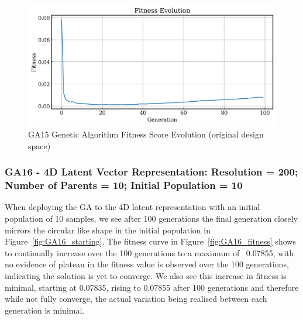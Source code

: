 \documentclass{article}
\begin{document}
\begin{figure}[H]
    \centering
    \includegraphics[width=0.75\linewidth]{figures/GAResults/GA15/original/original_fitness.png}
    \caption{GA15 Genetic Algorithm Fitness Score Evolution (original design space)}
    \label{fig:GA15_fitness_original}
\end{figure}

\subsubsection*{GA16 - 4D Latent Vector Representation: Resolution = 200; Number of Parents = 10; Initial Population = 10}

When deploying the GA to the 4D latent representation with an initial population of 10 samples, we see after 100 generations the final generation closely mirrors the circular like shape in the initial population in Figure~\ref{fig:GA16_starting}. The fitness curve in Figure~\ref{fig:GA16_fitness} shows to continually increase over the 100 generations to a maximum of ~0.07855, with no evidence of plateau in the fitness value is observed over the 100 generations, indicating the solution is yet to converge. We also see this increase in fitness is minimal, starting at 0.07835, rising to 0.07855 after 100 generations and therefore while not fully converge, the actual variation being realised between each generation is minimal.
\end{document}
